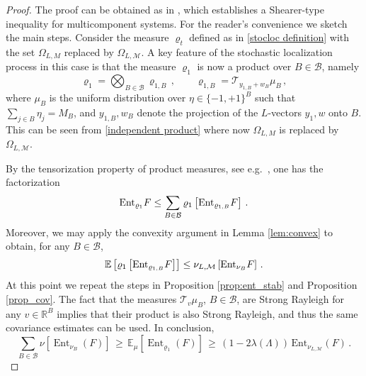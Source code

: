 \documentclass[11pt,reqno]{amsart}
\numberwithin{equation}{section}
\numberwithin{figure}{section}
\newcommand{\ent}{{\rm Ent}}
\newcommand{\1}{\mathds{1}}
\let\O=\Omega
\newcommand{\cB}{\ensuremath{\mathcal B}}
\newcommand{\cM}{\ensuremath{\mathcal M}}
\newcommand{\cT}{\ensuremath{\mathcal T}}
\newcommand{\bbE}{{\ensuremath{\mathbb E}} }
\newcommand{\bbR}{{\ensuremath{\mathbb R}} }
\begin{document}
\begin{proof}
The proof can be obtained as in \cite[Theorem 2.8]{caputo2025factorizations}, which establishes a Shearer-type inequality for multicomponent systems. For the reader's convenience we sketch the main steps. Consider the measure $\varrho_t$ defined as in \eqref{stocloc definition}
with the set $\O_{L,M}$ replaced by $\O_{L,\cM}$. A key feature of the stochastic localization process in this case is that the measure $\varrho_1$ is now a product over $B\in\cB$, namely
\[
\varrho_1 = \bigotimes_{B\in\cB} \varrho_{1,B}\,,\qquad \varrho_{1,B} = \cT_{y_{1,B}+w_B}\mu_B\,,
\]
where $\mu_B$ is the uniform distribution over $\eta\in \{-1,+1\}^B$ such that $\sum_{j\in B}\eta_j=M_B$, and $y_{1,B},w_B$ denote the projection of the $L$-vectors $y_1,w$ onto $B$. This can be seen from \eqref{independent product} where now $\O_{L,M}$ is replaced by $\O_{L,\cM}$. 

By the tensorization property of product measures, see e.g.\ \cite{EntLecNotes}, one has the factorization
\begin{equation}\label{eq:tensoB}
\ent_{\varrho_1}F \le \sum_{B\in\cB} \varrho_1\left[\ent_{\varrho_{1,B}}F\right]\,.
\end{equation}
Moreover, we may apply the convexity argument in Lemma \ref{lem:convex} to obtain, for any $B\in\cB$, 
\begin{equation}\label{eq:tensoB1}
\bbE\left[ \varrho_1\left[\ent_{\varrho_{1,B}}F\right]\right]\le \nu_{L,\cM}\left[\ent_{\nu_B}F\right]\,.
\end{equation}
At this point we repeat the steps in  Proposition \ref{prop:ent_stab} and Proposition \ref{prop_cov}. The fact that 
the measures $\cT_{v}\mu_B$, $B\in\cB$, are Strong Rayleigh for any $v\in\bbR^B$ implies that their product is also  Strong Rayleigh, and thus the same covariance estimates can be used. In conclusion,
\[
\sum_{B \in \mathcal{B}} \nu\left[\operatorname{Ent}_{\nu_B}(F)\right] \,\ge\, \mathbb{E}_\mu\left[\operatorname{Ent}_{\varrho_{1}}(F)\right]\,\ge\,
(1 - 2\lambda(\Lambda))\, \mathrm{Ent}_{\nu_{L,\cM}}(F) \,.
\]
\end{proof}
\end{document}

